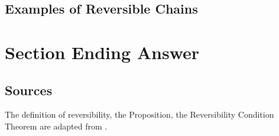 \documentclass[12pt]{article}
\begin{document}
\subsection*{Examples of Reversible Chains}

\section*{Section Ending Answer}

\subsection*{Sources}

The definition of reversibility, the Proposition,  the
Reversibility Condition Theorem are adapted from
.
\end{document}
